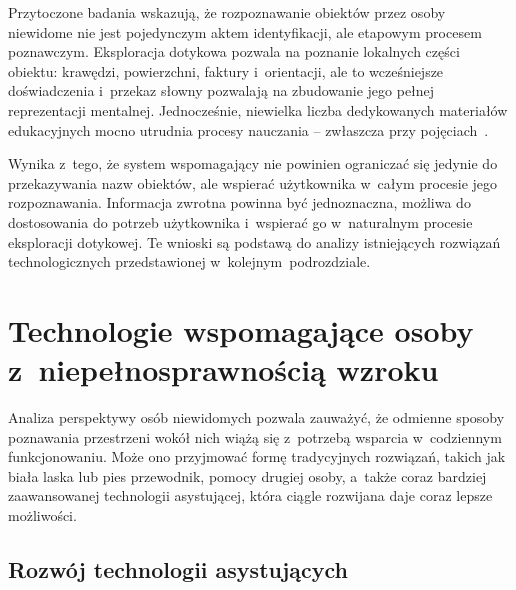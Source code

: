 Przytoczone badania wskazują, że rozpoznawanie obiektów przez osoby niewidome nie jest pojedynczym aktem identyfikacji, ale etapowym procesem poznawczym. Eksploracja dotykowa pozwala na poznanie lokalnych części obiektu: krawędzi, powierzchni, faktury i~orientacji, ale to wcześniejsze doświadczenia i~przekaz słowny pozwalają na zbudowanie jego pełnej reprezentacji mentalnej. Jednocześnie, niewielka liczba dedykowanych materiałów edukacyjnych mocno utrudnia procesy nauczania -- zwłaszcza przy pojęciach~.

Wynika z~tego, że system wspomagający nie powinien ograniczać się jedynie do przekazywania nazw obiektów, ale wspierać użytkownika w~całym procesie jego rozpoznawania. Informacja zwrotna powinna być jednoznaczna, możliwa do dostosowania do potrzeb użytkownika i~wspierać go w~naturalnym procesie eksploracji dotykowej. Te wnioski są podstawą do analizy istniejących rozwiązań technologicznych przedstawionej w~kolejnym~podrozdziale.

\section{Technologie wspomagające osoby z~niepełnosprawnością wzroku}

Analiza perspektywy osób niewidomych pozwala zauważyć, że odmienne sposoby poznawania przestrzeni wokół nich wiążą się z~potrzebą wsparcia w~codziennym funkcjonowaniu. Może ono przyjmować formę tradycyjnych rozwiązań, takich jak biała laska lub pies przewodnik, pomocy drugiej osoby, a~także coraz bardziej zaawansowanej technologii asystującej, która ciągle rozwijana daje coraz lepsze możliwości.

\subsection{Rozwój technologii asystujących}

